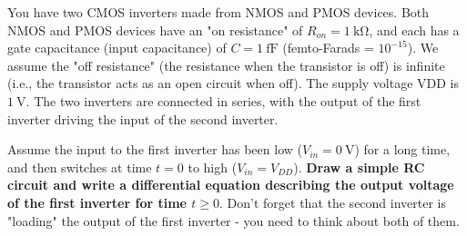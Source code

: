 
You have two CMOS inverters made from NMOS and PMOS devices. Both NMOS and PMOS devices have an "on resistance" of $R_{on}=\SI{1}{\kilo\ohm}$, and each has a gate capacitance (input capacitance) of $C=\SI{1}{\femto\farad}$ (femto-Farads = $10^{-15}$).
We assume the "off resistance" (the resistance when the transistor is off) is infinite (i.e., the transistor acts as an open circuit when off).
The supply voltage VDD is $\SI{1}{\volt}$. The two inverters are connected in series, with the output of the first inverter driving the input of the second inverter.

  


\begin{enumerate}



\qitem Assume the input to the first inverter has been low ($V_{in} = \SI{0}{\volt}$) for a long time, and then switches at time $t = 0$ to high ($V_{in} = V_{DD}$).
\textbf{Draw a simple RC circuit and write a differential equation describing the output voltage of the first inverter for time $t \geq 0$}.
Don’t forget that the second inverter is "loading" the output of the first inverter - you need to think about both of them.

\end{enumerate}
